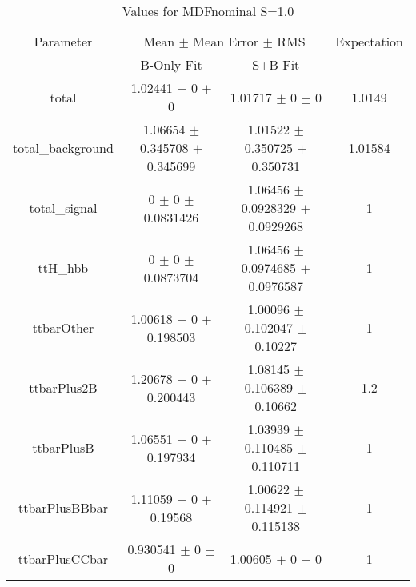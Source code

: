 \begin{table}
\centering
\caption{Values for MDFnominal S=1.0}
\begin{tabular}{cccc}
\toprule
Parameter & \multicolumn{2}{c}{Mean $\pm$ Mean Error $\pm$ RMS} & Expectation\\
 & B-Only Fit & S+B Fit & \\
\midrule
total & \num{1.02441} $\pm$ \num{0} $\pm$ \num{0} & \num{1.01717} $\pm$ \num{0} $\pm$ \num{0} & \num{1.0149}\\
total\_background & \num{1.06654} $\pm$ \num{0.345708} $\pm$ \num{0.345699} & \num{1.01522} $\pm$ \num{0.350725} $\pm$ \num{0.350731} & \num{1.01584}\\
total\_signal & \num{0} $\pm$ \num{0} $\pm$ \num{0.0831426} & \num{1.06456} $\pm$ \num{0.0928329} $\pm$ \num{0.0929268} & \num{1}\\
ttH\_hbb & \num{0} $\pm$ \num{0} $\pm$ \num{0.0873704} & \num{1.06456} $\pm$ \num{0.0974685} $\pm$ \num{0.0976587} & \num{1}\\
ttbarOther & \num{1.00618} $\pm$ \num{0} $\pm$ \num{0.198503} & \num{1.00096} $\pm$ \num{0.102047} $\pm$ \num{0.10227} & \num{1}\\
ttbarPlus2B & \num{1.20678} $\pm$ \num{0} $\pm$ \num{0.200443} & \num{1.08145} $\pm$ \num{0.106389} $\pm$ \num{0.10662} & \num{1.2}\\
ttbarPlusB & \num{1.06551} $\pm$ \num{0} $\pm$ \num{0.197934} & \num{1.03939} $\pm$ \num{0.110485} $\pm$ \num{0.110711} & \num{1}\\
ttbarPlusBBbar & \num{1.11059} $\pm$ \num{0} $\pm$ \num{0.19568} & \num{1.00622} $\pm$ \num{0.114921} $\pm$ \num{0.115138} & \num{1}\\
ttbarPlusCCbar & \num{0.930541} $\pm$ \num{0} $\pm$ \num{0} & \num{1.00605} $\pm$ \num{0} $\pm$ \num{0} & \num{1}\\
\bottomrule
\end{tabular}
\end{table}